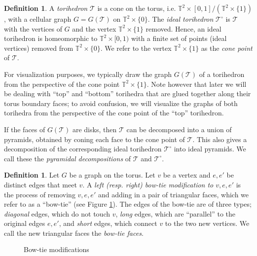 \documentclass[11pt]{amsart}
\newcommand{\figref}[1]{Figure \ref{#1}}
\newcommand{\torus}{{\mathbb{T}^2}}
\newcommand{\sT}{{\mathcal{T}}}
\theoremstyle{plain}
\theoremstyle{definition}
\newtheorem{define}[theorem]{Definition}
\newtheorem{definition}[theorem]{Definition}
\begin{document}
\begin{define}\cite{CKP2}
\label{def:torihedron}
A \emph{torihedron} $\sT$ is a cone on the torus, 
i.e. $\torus \times [0,1]/(\torus \times \{1\})$, with a cellular graph
$G = G(\sT)$ on $\torus \times \{0\}$.
The \emph{ideal torihedron} $\sT^\circ$ is $\sT$ with the
vertices of $G$ and the vertex $\torus \times \{1\}$ removed. Hence, an ideal
torihedron is homeomorphic to $\torus \times [0,1)$ with a finite set of points
(ideal vertices) removed from $\torus \times \{0\}$.
We refer to the vertex $\torus \times \{1\}$ as the \emph{cone point}
of $\sT$.
\end{define}


For visualization purposes, we typically draw the graph $G(\sT)$ of a
torihedron from the perspective of the cone point $\torus \times \{1\}$.
Note however that later we will be dealing with
``top'' and ``bottom'' torihedra that are glued together
along their torus boundary faces;
to avoid confusion, we will visualize the graphs of both torihedra
from the perspective of the cone point of the ``top'' torihedron.


If the faces of $G(\sT)$ are disks,
then $\sT$ can be decomposed into a union of pyramids,
obtained by coning each face to the cone point of $\sT$.
This also gives a decomposition of the corresponding ideal torihedron
$\sT^\circ$ into ideal pyramids.
We call these the \emph{pyramidal decompositions} of $\sT$ and $\sT^\circ$.


\begin{definition}
Let $G$ be a graph on the torus.
Let $v$ be a vertex and $e,e'$ be distinct edges that meet $v$.
A \emph{left (resp. right) bow-tie modification to $v,e,e'$}
is the process of removing $v,e,e'$ and adding in
a pair of triangular faces, which we refer to as a ``bow-tie''
(see \figref{f:bow-tie-modification}).
The edges of the bow-tie are of three types;
\emph{diagonal} edges, which do not touch $v$,
\emph{long} edges, which are ``parallel'' to the original edges $e,e'$,
and \emph{short} edges, which connect $v$ to the two new vertices.
We call the new triangular faces the \emph{bow-tie faces}.


\begin{figure}[ht]

\caption{Bow-tie modifications}
\label{f:bow-tie-modification}
\end{figure}


\label{d:diagram-bowtie}
\end{definition}
\end{document}
